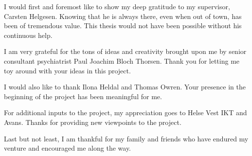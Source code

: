 \begin{acknowledgements}
    I would first and foremost like to show my deep gratitude to my supervisor, Carsten Helgesen. Knowing that he is always there, even when out of town, has been of tremendous value. This thesis would not have been possible without his continuous help.

    I am very grateful for the tons of ideas and creativity brought upon me by senior consultant psychiatrist Paul Joachim Bloch Thorsen. Thank you for letting me toy around with your ideas in this project.

    I would also like to thank Ilona Heldal and Thomas Owren. Your presence in the beginning of the project has been meaningful for me.

    For additional inputs to the project, my appreciation goes to Helse Vest IKT and Avans. Thanks for providing new viewpoints to the project.

    Last but not least, I am thankful for my family and friends who have endured my venture and encouraged me along the way.
\end{acknowledgements}
